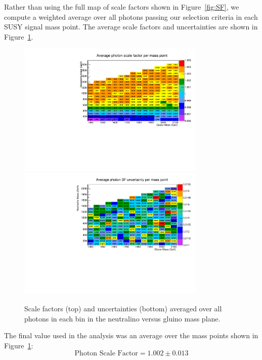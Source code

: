 Rather than using the full map of scale factors shown in Figure~\ref{fig:SF},
we compute a weighted average over all photons passing our selection criteria
in each SUSY signal mass point.
The average scale factors and uncertainties are shown in Figure~\ref{fig:SFmap}.

\begin{figure}[htbp]
    \centering
    \includegraphics[width=0.8\textwidth]{Figures/EventSelect/sfmap.pdf}
    \includegraphics[width=0.8\textwidth]{Figures/EventSelect/sfmap_errors.pdf}
    \caption{Scale factors (top) and uncertainties (bottom)
      averaged over all photons in each bin in the neutralino
      versus gluino mass plane.}
    \label{fig:SFmap}
\end{figure}

The final value used in the analysis was an average over the mass
points shown in Figure~\ref{fig:SFmap}:
\begin{equation}
  \textrm{Photon Scale Factor} = 1.002\pm0.013
\end{equation}


